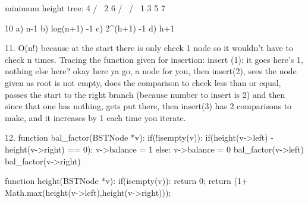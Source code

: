     minimum height tree:
    	 4
       /  \
      2    6
     / \  / \
    1  3  5  7

10
	a) n-1
	b) log(n+1) -1
	c) 2^(h+1) -1
	d) h+1

11. O(n!) because at the start there is only check 1 node so it wouldn't have to check n times.
Tracing the function given for insertion:
insert (1): it goes here's 1, nothing else here? okay here ya go, a node for you, then insert(2), sees the node given as root is not empty, does the comparison to check less than or equal, passes the start to the right branch (because number to insert is 2) and then since that one has nothing, gets put there, then insert(3) has 2 comparisons to make, and it increases by 1 each time you iterate.

12. function bal_factor(BSTNode *v):
		if(!isempty(v)):
			if(height(v->left) - height(v->right) == 0):
				v->balance = 1
			else:
				v->balance = 0
			bal_factor(v->left)
			bal_factor(v->right)

	function height(BSTNode *v):
		if(isempty(v)): return 0;
		return (1+ Math.max(height(v->left),height(v->right)));